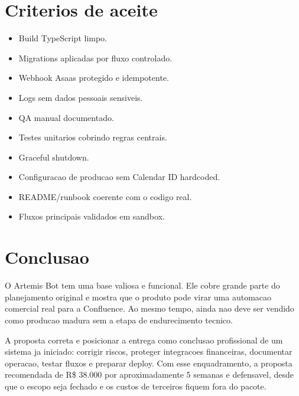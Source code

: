 \documentclass[11pt,a4paper]{article}
\begin{document}
\section{Criterios de aceite}

\begin{itemize}
  \item Build TypeScript limpo.
  \item Migrations aplicadas por fluxo controlado.
  \item Webhook Asaas protegido e idempotente.
  \item Logs sem dados pessoais sensiveis.
  \item QA manual documentado.
  \item Testes unitarios cobrindo regras centrais.
  \item Graceful shutdown.
  \item Configuracao de producao sem Calendar ID hardcoded.
  \item README/runbook coerente com o codigo real.
  \item Fluxos principais validados em sandbox.
\end{itemize}

\section{Conclusao}

O Artemis Bot tem uma base valiosa e funcional. Ele cobre grande parte do planejamento original e mostra que o produto pode virar uma automacao comercial real para a Confluence. Ao mesmo tempo, ainda nao deve ser vendido como producao madura sem a etapa de endurecimento tecnico.

A proposta correta e posicionar a entrega como conclusao profissional de um sistema ja iniciado: corrigir riscos, proteger integracoes financeiras, documentar operacao, testar fluxos e preparar deploy. Com esse enquadramento, a proposta recomendada de R\$ 38.000 por aproximadamente 5 semanas e defensavel, desde que o escopo seja fechado e os custos de terceiros fiquem fora do pacote.
\end{document}
